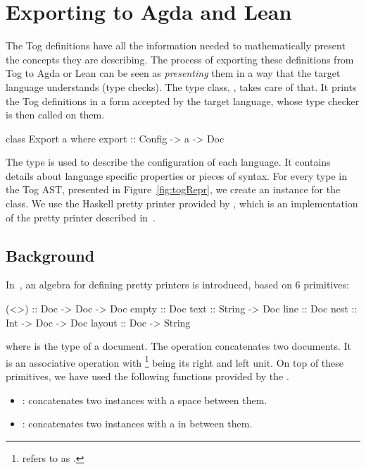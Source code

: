 \section{Exporting to Agda and Lean}
\label{sec:exporting_agda}
The Tog definitions have all the information needed to mathematically present the concepts they are describing. The process of exporting these definitions from Tog to Agda or Lean can be seen as \emph{presenting} them in a way that the target language understands (type checks). The type class, , takes care of that. It prints the Tog definitions in a form accepted by the target language, whose type checker is then called on them. 
\begin{hscode}
class Export a where
  export :: Config -> a -> Doc  
\end{hscode}
The  type is used to describe the configuration of each language. It contains details about language specific properties or pieces of syntax. 
For every type in the Tog AST, presented in Figure~\ref{fig:togRepr}, we create an instance for the  class.
We use the Haskell pretty printer provided by , which is an implementation of the pretty printer described in~\cite{wadler2003prettier}. 

\subsection{Background}
In~\cite{wadler2003prettier}, an algebra for defining pretty printers is introduced, based on $6$ primitives: 
\begin{hscode}
(<>) :: Doc -> Doc -> Doc 
empty  :: Doc 
text :: String -> Doc 
line :: Doc 
nest :: Int -> Doc -> Doc 
layout :: Doc -> String 
\end{hscode}
\noindent where  is the type of a document. The \lstmath{(<>)} operation concatenates two documents. It is an associative operation with \footnote{\cite{wadler2003prettier} refers to  as .} being its right and left unit. 
On top of these primitives, we have used the following functions provided by the 
. 
\begin{itemize}
\item \lstmath{(<+>)} : concatenates two  instances with a space between them. 
\item \lstmath{(<$\$\$$>)} : concatenates two  instances with a  in between them. 
\end{itemize}


